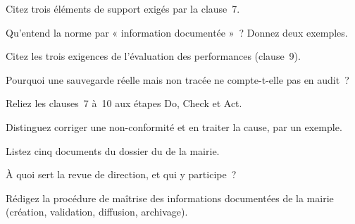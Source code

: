 \bigskip

\begin{boxexo}[title={\ding{45}\quad Exercice~9.1. La clause 7 \niveaubase}]
Citez trois éléments de support exigés par la clause~7.
\end{boxexo}

\begin{boxexo}[title={\ding{45}\quad Exercice~9.2. Documenté \niveaubase}]
Qu'entend la norme par « information documentée »~? Donnez deux exemples.
\end{boxexo}

\begin{boxexo}[title={\ding{45}\quad Exercice~9.3. Les trois exigences \niveaubase}]
Citez les trois exigences de l'évaluation des performances (clause~9).
\end{boxexo}

\begin{boxexo}[title={\ding{45}\quad Exercice~9.4. Mesure sans preuve \niveaumoyen}]
Pourquoi une sauvegarde réelle mais non tracée ne compte-t-elle pas en audit~?
\end{boxexo}

\begin{boxexo}[title={\ding{45}\quad Exercice~9.5. PDCA et clauses \niveaumoyen}]
Reliez les clauses~7 à~10 aux étapes Do, Check et Act.
\end{boxexo}

\begin{boxexo}[title={\ding{45}\quad Exercice~9.6. Non-conformité \niveaumoyen}]
Distinguez corriger une non-conformité et en traiter la cause, par un exemple.
\end{boxexo}

\begin{boxexo}[title={\ding{45}\quad Exercice~9.7. Dossier de preuves \niveaumoyen}]
Listez cinq documents du dossier du  de la mairie.
\end{boxexo}

\begin{boxexo}[title={\ding{45}\quad Exercice~9.8. Revue de direction \niveaumoyen}]
À quoi sert la revue de direction, et qui y participe~?
\end{boxexo}

\begin{boxexo}[title={\ding{45}\quad Exercice~9.9. Procédure documentaire \niveauexpert}]
Rédigez la procédure de maîtrise des informations documentées de la mairie
(création, validation, diffusion, archivage).
\end{boxexo}

